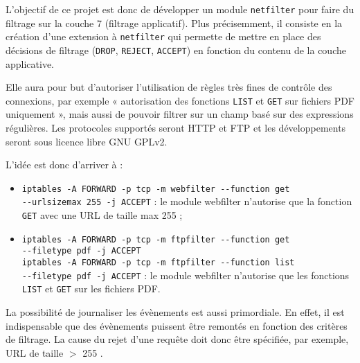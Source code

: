 L'objectif de ce projet est donc de développer un module \verb+netfilter+ pour faire du filtrage sur la couche 7 (filtrage applicatif). Plus précisemment, il consiste en la création d'une extension à \verb+netfilter+ qui permette de mettre en place des décisions de filtrage (\verb+DROP+, \verb+REJECT+, \verb+ACCEPT+) en fonction du contenu de la couche applicative.

Elle aura pour but d'autoriser l'utilisation de règles très fines de contrôle des connexions, par exemple « autorisation des fonctions \verb+LIST+ et \verb+GET+ sur fichiers PDF uniquement », mais aussi de pouvoir filtrer sur un champ basé sur des expressions régulières. Les protocoles supportés seront HTTP et FTP et les développements seront sous licence libre GNU GPLv2.

L'idée est donc d'arriver à :
\begin{itemize}
\item \verb+iptables -A FORWARD -p tcp -m webfilter --function get+\\ \verb+--urlsizemax 255 -j ACCEPT+ : le module \og webfilter \fg{} n'autorise que la fonction \verb+GET+ avec une URL de taille max 255 ;
\item \verb+iptables -A FORWARD -p tcp -m ftpfilter --function get+\\
\verb+--filetype pdf -j ACCEPT+\\
\verb+iptables -A FORWARD -p tcp -m ftpfilter --function list+\\
\verb+--filetype pdf -j ACCEPT+ : le module \og webfilter \fg{} n'autorise que les fonctions \verb+LIST+ et \verb+GET+ sur les fichiers PDF.
\end{itemize}

La possibilité de journaliser les évènements est aussi primordiale. En effet, il est indispensable que des évènements puissent être remontés en fonction des critères de filtrage. La cause du rejet d'une requête doit donc être spécifiée, par exemple, \og URL de taille $>$ 255 \fg{}.
